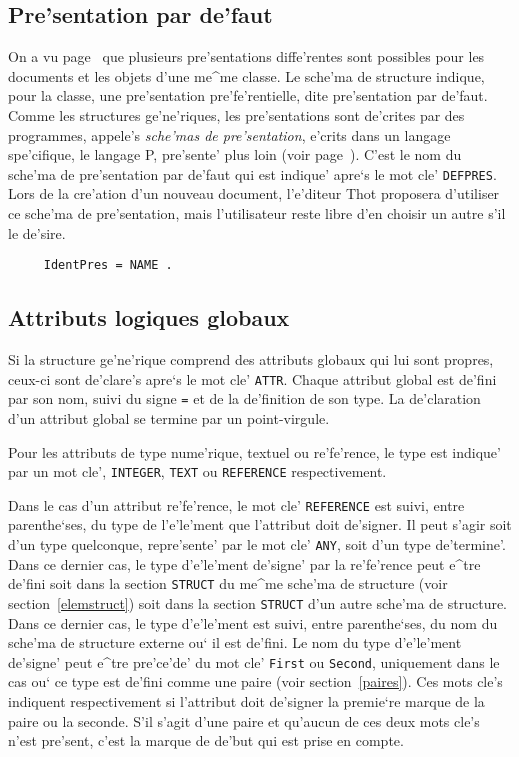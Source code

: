 \subsection{Pre'sentation par de'faut}

On a vu page~\pageref{presmul} que plusieurs pre'sentations diffe'rentes sont
possibles pour les documents et les objets d'une me^me classe. Le sche'ma de
structure indique, pour la classe, une pre'sentation pre'fe'rentielle, dite
pre'sentation par de'faut. Comme les structures ge'ne'riques, les pre'sentations
sont de'crites par des programmes, appele's {\em sche'mas de pre'sentation},
e'crits dans un langage spe'cifique, le langage P, pre'sente' plus loin
(voir page~\pageref{langp}). C'est le nom du sche'ma de pre'sentation par
de'faut qui est indique' apre`s le mot cle' {\tt DEFPRES}. Lors de la cre'ation
d'un nouveau document, l'e'diteur Thot proposera d'utiliser ce sche'ma de
pre'sentation, mais l'utilisateur reste libre d'en choisir un autre s'il le
de'sire.

\begin{verbatim}
     IdentPres = NAME .
\end{verbatim}

\subsection{Attributs logiques globaux}
\label{attrglobaux}

Si la structure ge'ne'rique comprend des attributs globaux qui lui sont
propres, ceux-ci sont de'clare's apre`s le mot cle' {\tt ATTR}. Chaque
attribut global est de'fini par son nom, suivi du signe {\tt =} et de la
de'finition de son type. La de'claration d'un attribut global se termine par
un point-virgule.

Pour les attributs de type nume'rique, textuel ou re'fe'rence, le type est
indique' par un mot cle', {\tt INTEGER}, {\tt TEXT} ou {\tt REFERENCE}
respectivement.

Dans le cas d'un attribut re'fe'rence, le mot cle' {\tt REFERENCE} est
suivi, entre parenthe`ses, du type de l'e'le'ment que l'attribut doit
de'signer.
Il peut s'agir soit d'un type quelconque, repre'sente' par le mot cle'
{\tt ANY}, soit d'un type de'termine'. Dans ce dernier cas, le type
d'e'le'ment de'signe' par la re'fe'rence peut e^tre de'fini soit dans la section
{\tt STRUCT} du me^me sche'ma de structure (voir section~\ref{elemstruct})
soit dans la section {\tt STRUCT} d'un autre sche'ma de structure.
Dans ce dernier cas, le type d'e'le'ment est suivi, entre
parenthe`ses, du nom du sche'ma de structure externe ou` il est de'fini.
Le nom du type d'e'le'ment de'signe' peut e^tre pre'ce'de' du mot cle'
{\tt First} ou {\tt Second}, uniquement dans le cas ou` ce type est de'fini
comme une paire (voir section~\ref{paires}). Ces mots cle's indiquent
respectivement si l'attribut doit de'signer la premie`re marque de la paire
ou la seconde. S'il s'agit d'une paire et qu'aucun de ces deux mots cle's
n'est pre'sent, c'est la marque de de'but qui est prise en compte.

